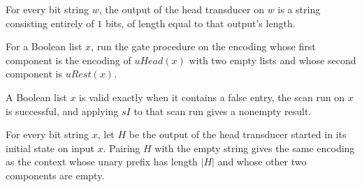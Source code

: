 \begin{theorem}
\label{Randomized.PIT.uHead_eq_replicate}
\leanok
{}
For every bit string $w$, the output of the head transducer on $w$ is a string
consisting entirely of $1$ bits, of length equal to that output's length.
\end{theorem}

\begin{definition}
\label{Randomized.PIT.scanRun}
\leanok
{}
For a Boolean list $x$, run the gate procedure on the encoding whose first component is
the encoding of $uHead(x)$ with two empty lists and whose second component is
$uRest(x)$.
\end{definition}

\begin{definition}
\label{Randomized.PIT.validW}
\leanok
{}
A Boolean list $x$ is valid exactly when it contains a false entry, the scan run on $x$
is successful, and applying $sI$ to that scan run gives a nonempty result.
\end{definition}

\begin{theorem}
\label{Randomized.PIT.scan_ctx}
\leanok
{}
For every bit string $x$, let $H$ be the output of the head transducer started in its
initial state on input $x$. Pairing $H$ with the empty string gives the same encoding as
the context whose unary prefix has length $|H|$ and whose other two components are
empty.
\end{theorem}

